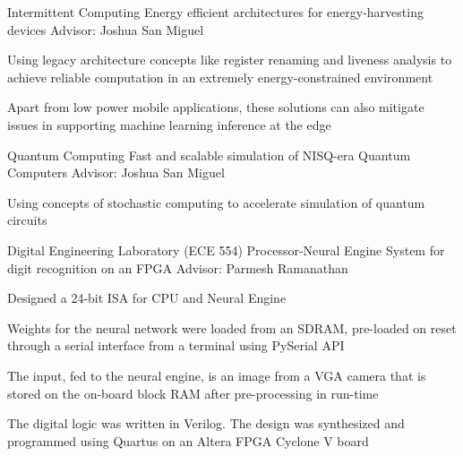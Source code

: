 
\begin{cventries}
\cventry
    {Intermittent Computing}
    {Energy efficient architectures for energy-harvesting devices}
    {Advisor: Joshua San Miguel}
    {}
    {
     \begin{cvitems} %
        \item {Using legacy architecture concepts like register renaming and liveness analysis to achieve reliable computation in an extremely energy-constrained environment}
        \item {Apart from low power mobile applications, these solutions can also mitigate issues in supporting machine learning inference at the edge}
      \end{cvitems}
    }
    
  \cventry
    {Quantum Computing} %
    {Fast and scalable simulation of NISQ-era Quantum Computers} %
    {Advisor: Joshua San Miguel} %
    {} %
    {
      \begin{cvitems} %
        \item {Using concepts of stochastic computing to accelerate simulation of quantum circuits}
      \end{cvitems}
    }
    
  \cventry
    {Digital Engineering Laboratory (ECE 554)}
    {Processor-Neural Engine System for digit recognition on an FPGA}
    {Advisor: Parmesh Ramanathan}
    {}
    {
     \begin{cvitems} %
        \item {Designed a 24-bit ISA for CPU and Neural Engine}
        \item {Weights for the neural network were loaded from an SDRAM, pre-loaded on reset through a serial interface from a terminal using PySerial API}
        \item {The input, fed to the neural engine, is an image from a VGA camera that is stored on the on-board block RAM after pre-processing in run-time}
        \item {The digital logic was written in Verilog. The design was synthesized and programmed using Quartus on an Altera FPGA Cyclone V board}
      \end{cvitems}
    }
    

\end{cventries}
